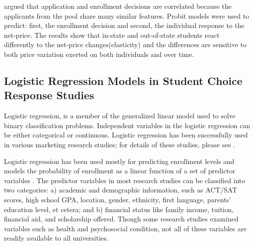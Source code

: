 \documentclass[12pt,english]{report}
\begin{document}
\citet{Curs2002} argued that application and enrollment decisions are correlated because the applicants from the pool share
many similar features. Probit models were used to predict: first, the enrollment decision and second, the individual response
to the net-price. The results show that in-state and out-of-state students react differently to the net-price changes(elasticity)
and the differences are sensitive to both price variation exerted on both individuals and over time. 

\subsection{Logistic Regression Models in Student Choice Response Studies}

Logistic regression,  is a member of the generalized linear model used to solve binary classification problems. Independent variables  in the logistic regression can be either categorical or continuous. %
Logistic regression has been successfully used in various marketing research studies; for details of these studies, please see \citep{Hosmer2013}.

\vspace{0.15in}
Logistic regression has been used mostly for predicting enrollment levels and models the probability of enrollment as a linear function of a set of predictor variables \citep{lr_summary}. The predictor  variables in most research studies can be classified into two categories: a) academic and demographic information, such as ACT/SAT scores, high school GPA, location, gender, ethnicity, first language, parents' education level, et cetera; and b) financial status like family income, tuition, financial aid, and scholarship offered. Though some research studies examined variables such as health and psychosocial condition, not all of these variables are readily available to all universities.
\end{document}
